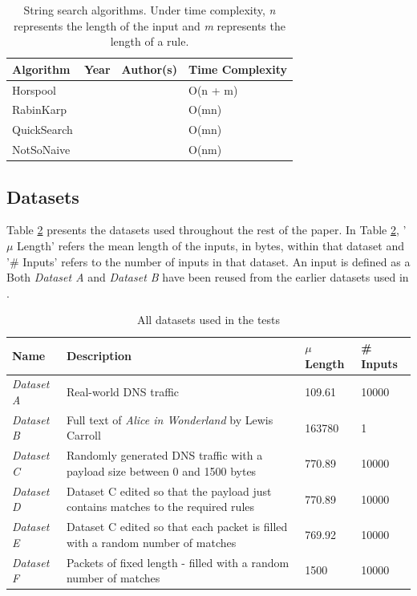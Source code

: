 \documentclass[11pt]{article}
\begin{document}
\begin{table}[!hbt]
\centering
\begin{tabular}{@{}llll@{}}
  \toprule
  Algorithm & Year & Author(s) & Time Complexity \\ \midrule
  Horspool & \citeyear{horspool1980} & \citeauthor{horspool1980} & O(n + m) \\
  RabinKarp & \citeyear{karp1987} & \citeauthor{karp1987} & O(mn) \\
  QuickSearch & \citeyear{sunday1990} & \citeauthor{sunday1990} & O(mn) \\
  NotSoNaive & \citeyear{hancart1993} & \citeauthor{hancart1993} & O(nm) \\ \bottomrule
 \end{tabular}
\caption{String search algorithms. Under time complexity, \textit{n} represents the length of the input and \textit{m} represents the length of a rule.}
\label{table-algorithms}
\end{table}

\subsection{Datasets}

Table \ref{table-datasets} presents the datasets used throughout the rest of the paper. In Table \ref{table-datasets}, '$\mu$ Length' refers the mean length of the inputs, in bytes, within that dataset and '\# Inputs' refers to the number of inputs in that dataset. An input is defined as a Both \textit{Dataset A} and \textit{Dataset B} have been reused from the earlier datasets used in \citet{hunt2016}.

\begin{table}[!htb]
\centering
\begin{tabular}{@{}lp{}ll@{}}
\toprule
Name & Description & $\mu$ Length & \# Inputs \\ \midrule
\textit{Dataset A} & Real-world DNS traffic & 109.61 & 10000 \\
\textit{Dataset B} & Full text of \textit{Alice in Wonderland} by Lewis Carroll & 163780 & 1 \\
\textit{Dataset C} & Randomly generated DNS traffic with a payload size between 0 and 1500 bytes & 770.89 & 10000 \\
\textit{Dataset D} & Dataset C edited so that the payload just contains matches to the required rules & 770.89 & 10000 \\
\textit{Dataset E} & Dataset C edited so that each packet is filled with a random number of matches & 769.92 & 10000 \\
\textit{Dataset F} & Packets of fixed length - filled with a random number of matches & 1500 & 10000 \\ \bottomrule
\end{tabular}
\caption{All datasets used in the tests}
\label{table-datasets}
\end{table}
\end{document}
